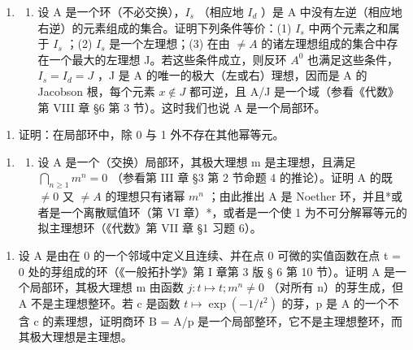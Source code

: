 
\begin{enumerate}
\def\labelenumi{\arabic{enumi}.}
\tightlist
\item
  \begin{enumerate}
  \def\labelenumii{(\alph{enumii})}
  \tightlist
  \item
    设 A 是一个环（不必交换），\(I_{s}\) （相应地 \(I_{d}\) ）是 A 中没有左逆（相应地右逆）的元素组成的集合。证明下列条件等价：(1) \(I_{s}\) 中两个元素之和属于 \(I_{s}\) ；(2) \(I_{s}\) 是一个左理想；(3) 在由 \(\neq A\) 的诸左理想组成的集合中存在一个最大的左理想 J。若这些条件成立，则反环 \(A^{0}\) 也满足这些条件，\(I_{s} = I_{d} = J\) ，J 是 A 的唯一的极大（左或右）理想，因而是 A 的 Jacobson 根，每个元素 \(x \notin J\) 都可逆，且 A/J 是一个域（参看《代数》第 VIII 章 §6 第 3 节）。这时我们也说 A 是一个局部环。
  \end{enumerate}
\end{enumerate}

\begin{enumerate}
\def\labelenumi{(\alph{enumi})}
\setcounter{enumi}{1}
\tightlist
\item
  证明：在局部环中，除 0 与 1 外不存在其他幂等元。
\end{enumerate}

\begin{enumerate}
\def\labelenumi{\arabic{enumi}.}
\setcounter{enumi}{1}
\tightlist
\item
  \begin{enumerate}
  \def\labelenumii{(\alph{enumii})}
  \tightlist
  \item
    设 A 是一个（交换）局部环，其极大理想 m 是主理想，且满足 \(\bigcap_{n\geqslant1}m^{n}=0\) （参看第 III 章 §3 第 2 节命题 4 的推论）。证明 A 的既 \(\neq0\) 又 \(\neq A\) 的理想只有诸幂 \(m^{n}\) ；由此推出 A 是 Noether 环，并且*或者是一个离散赋值环（第 VI 章）*，或者是一个使 1 为不可分解幂等元的拟主理想环（《代数》第 VII 章 §1 习题 6）。
  \end{enumerate}
\end{enumerate}

\begin{enumerate}
\def\labelenumi{(\alph{enumi})}
\setcounter{enumi}{1}
\tightlist
\item
  设 A 是由在 0 的一个邻域中定义且连续、并在点 0 可微的实值函数在点 t = 0 处的芽组成的环（《一般拓扑学》第 I 章第 3 版 § 6 第 10 节）。证明 A 是一个局部环，其极大理想 m 由函数 \(j: t \mapsto t; m^{n} \neq 0\) （对所有 n）的芽生成，但 A 不是主理想整环。若 c 是函数 \(t \mapsto \exp(-1/t^{2})\) 的芽，p 是 A 的一个不含 c 的素理想，证明商环 B = A/p 是一个局部整环，它不是主理想整环，而其极大理想是主理想。
\end{enumerate}

